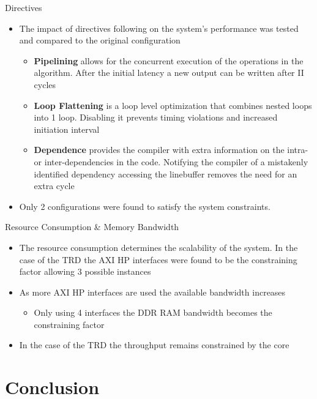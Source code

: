 \documentclass{beamer}
\begin{document}
\begin{frame}{Directives}
  \begin{itemize}
  \item The impact of directives following on the system's performance
    was tested and compared to the original configuration
    \begin{itemize}
    \item \textbf{Pipelining} allows for the concurrent execution of
      the operations in the algorithm. After the initial latency a new
      output can be written after II cycles
    \item \textbf{Loop Flattening} is a loop level optimization that
      combines nested loops into 1 loop. Disabling it prevents timing
      violations and increased initiation interval
    \item \textbf{Dependence} provides the compiler with extra
      information on the intra- or inter-dependencies in the
      code. Notifying the compiler of a mistakenly identified
      dependency accessing the linebuffer removes the need for an extra
      cycle
    \end{itemize}
  \item Only 2 configurations were found to satisfy the system
    constraints.
  \end{itemize}

\end{frame}
\begin{frame}{Resource Consumption \& Memory Bandwidth}
  \begin{itemize}
  \item The resource consumption determines the scalability of the system. In the case of the TRD the AXI HP interfaces were found to be the constraining factor allowing 3 possible instances
  \item As more AXI HP interfaces are used the available bandwidth increases
    \begin{itemize}
    \item Only using 4 interfaces the DDR RAM bandwidth becomes the constraining factor
    \end{itemize}
    \item In the case of the TRD the throughput remains constrained by the core 
  \end{itemize}
\end{frame}



\section{Conclusion}
\end{document}
